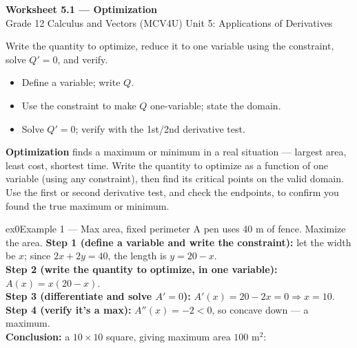 \documentclass[11pt]{article}
\begin{document}
\begin{center}
{\LARGE\bfseries\color{titleblue}Worksheet 5.1 --- Optimization}\\[2pt]
{\small Grade 12 Calculus and Vectors (MCV4U) \textperiodcentered{} Unit 5: Applications of Derivatives}
\end{center}

\begin{ideabox}
Write the quantity to optimize, reduce it to one variable using the constraint, solve $Q'=0$, and verify.
\begin{itemize}[leftmargin=*,itemsep=2pt]
  \item Define a variable; write $Q$.
  \item Use the constraint to make $Q$ one-variable; state the domain.
  \item Solve $Q'=0$; verify with the 1st/2nd derivative test.
\end{itemize}
\end{ideabox}

\begin{learnbox}
\textbf{Optimization} finds a maximum or minimum in a real situation — largest area, least cost, shortest time.
Write the quantity to optimize as a function of one variable (using any constraint), then find its critical points on the valid domain.
Use the first or second derivative test, and check the endpoints, to confirm you found the true maximum or minimum.
\end{learnbox}


\begin{example}{ex0}{Example 1 --- Max area, fixed perimeter}
A pen uses 40 m of fence. Maximize the area.\soln
\textbf{Step 1 (define a variable and write the constraint):} let the width be $x$; since $2x+2y=40$, the length is $y=20-x$.\\[3pt]
\textbf{Step 2 (write the quantity to optimize, in one variable):} $A(x)=x(20-x)$.\\[3pt]
\textbf{Step 3 (differentiate and solve $A'=0$):} $A'(x)=20-2x=0\Rightarrow x=10$.\\[3pt]
\textbf{Step 4 (verify it's a max):} $A''(x)=-2<0$, so concave down --- a maximum.\\[3pt]
\textbf{Conclusion:} a $10\times10$ square, giving maximum area $100$ m$^2$:
\end{example}
\end{document}

